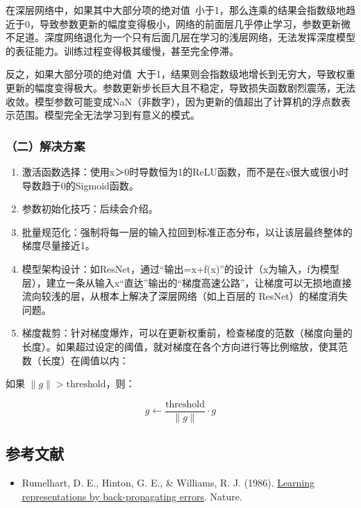 在深层网络中，如果其中大部分项的绝对值~小于1，那么连乘的结果会指数级地趋近于0，导致参数更新的幅度变得极小，网络的前面层几乎停止学习，参数更新微不足道。深度网络退化为一个只有后面几层在学习的浅层网络，无法发挥深度模型的表征能力。训练过程变得极其缓慢，甚至完全停滞。

反之，如果大部分项的绝对值~大于1，结果则会指数级地增长到无穷大，导致权重更新的幅度变得极大。参数更新步长巨大且不稳定，导致损失函数剧烈震荡，无法收敛。模型参数可能变成NaN（非数字），因为更新的值超出了计算机的浮点数表示范围。模型完全无法学习到有意义的模式。

\hypertarget{ux4e8cux89e3ux51b3ux65b9ux6848}{%
\subsubsection{（二）解决方案}\label{ux4e8cux89e3ux51b3ux65b9ux6848}}

\begin{enumerate}
\def\labelenumi{\arabic{enumi}.}
\item
  激活函数选择：使用x＞0时导数恒为1的ReLU函数，而不是在x很大或很小时导数趋于0的Sigmoid函数。
\item
  参数初始化技巧：后续会介绍。
\item
  批量规范化：强制将每一层的输入拉回到标准正态分布，以让该层最终整体的梯度尽量接近1。
\item
  模型架构设计：如ResNet，通过``输出=x+f(x)''的设计（x为输入，f为模型层），建立一条从输入x``直达''输出的``梯度高速公路''，让梯度可以无损地直接流向较浅的层，从根本上解决了深层网络（如上百层的 ResNet）的梯度消失问题。
\item
  梯度裁剪：针对梯度爆炸，可以在更新权重前，检查梯度的范数（梯度向量的长度）。如果超过设定的阈值，就对梯度在各个方向进行等比例缩放，使其范数（长度）在阈值以内：
\end{enumerate}

如果 \(\lVert g\rVert > \text{threshold}\)，则：

\[
g\leftarrow \frac{\text{threshold}}{\lVert g\rVert}\cdot g
\]

\hypertarget{ux53c2ux8003ux6587ux732e-2}{%
\subsection{参考文献}\label{ux53c2ux8003ux6587ux732e-2}}

\vspace{0.25em}
\begin{itemize}
\tightlist
\item
  Rumelhart, D. E., Hinton, G. E., \& Williams, R. J. (1986). \href{https://doi.org/10.1038/323533a0}{Learning representations by back-propagating errors}. Nature.
\end{itemize}


